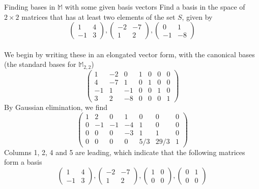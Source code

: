 \documentclass[journal, letterpaper]{IEEEtran}
\begin{document}
    \begin{myboxg}{Finding bases in $\mathbb{M}$ with some given basis vectors}
        Find a basis in the space of $2 \times 2$ matrices that has at least two elements of the set $S$, given by
        $$ \begin{pmatrix}
            1 & 4 \\ -1 & 3
        \end{pmatrix}, \begin{pmatrix}
            -2 & -7 \\ 1 & 2
        \end{pmatrix}, \begin{pmatrix}
            0 & 1 \\ -1 & -8
        \end{pmatrix}$$
        \newline \\ 
        We begin by writing these in an elongated vector form, with the canonical bases (the standard bases for $\mathbb{M}_{2, 2}$)
        $$ \begin{pmatrix}
            1 & -2 & 0 & 1 & 0 & 0 & 0  \\ 4 & -7 & 1 & 0 & 1 & 0 & 0 \\ 
            -1 & 1 & -1 & 0 & 0 &1 & 0 \\ 3 & 2 & -8 & 0 & 0 & 0 & 1
        \end{pmatrix}$$
        By Gaussian elimination, we find
        $$
        \begin{pmatrix}
            1 & 2 & 0 & 1 & 0 & 0 & 0 \\ 0 & -1 & -1 & -4 & 1 & 0 & 0 \\ 
            0 & 0 & 0 & -3 & 1 & 1 & 0 \\ 0 & 0 & 0 & 0 & 5/3 & 29/3 & 1
        \end{pmatrix}
        $$
        Columns 1, 2, 4 and 5 are leading, which indicate that the following matrices form a basis
        $$ 
        \begin{pmatrix}
            1 & 4 \\ -1 & 3
        \end{pmatrix}, \begin{pmatrix}
            -2 & -7 \\ 1 & 2
        \end{pmatrix}, \begin{pmatrix}
            1 & 0 \\ 0 & 0
        \end{pmatrix}, \begin{pmatrix}
            0 & 1 \\ 0 & 0
        \end{pmatrix}
        $$
    \end{myboxg}
\end{document}
